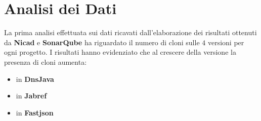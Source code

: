 \section{Analisi dei Dati}
La prima analisi effettuata sui dati ricavati dall'elaborazione dei risultati ottenuti da \textbf{Nicad} e \textbf{SonarQube} ha riguardato il numero di cloni sulle $4$ versioni per ogni progetto. I risultati hanno evidenziato che al crescere della versione la presenza di cloni aumenta:
\begin{itemize}
	\item in \textbf{DnsJava} 
	\item in \textbf{Jabref}
	\item in \textbf{Fastjson}
\end{itemize}